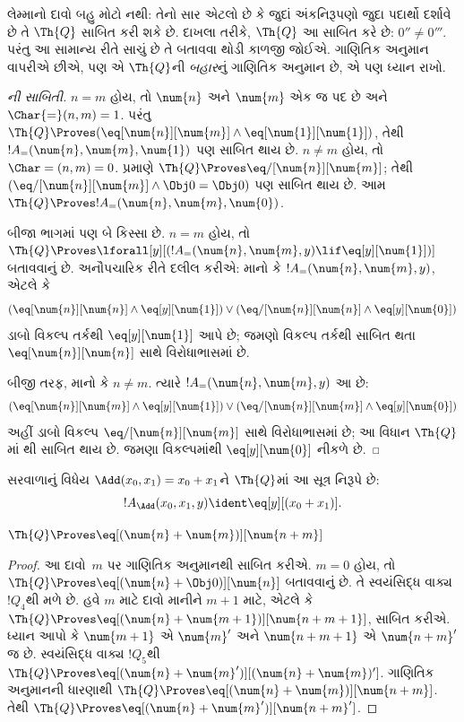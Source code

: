 \begin{explain}
લેમ્માનો દાવો બહુ મોટો નથી:
તેનો સાર એટલો છે કે જુદાં
અંકનિરૂપણો જુદા પદાર્થો દર્શાવે
છે તે $\Th{Q}$ સાબિત કરી શકે છે.
દાખલા તરીકે, $\Th{Q}$ આ સાબિત
કરે છે: $0'' \neq 0'''$.
પરંતુ આ સામાન્ય રીતે સાચું છે
તે બતાવવા થોડી કાળજી જોઈએ.
ગાણિતિક અનુમાન વાપરીએ છીએ, પણ એ
$\Th{Q}$ની \emph{બહાર}નું
ગાણિતિક અનુમાન છે, એ પણ ધ્યાન રાખો.
\end{explain}

\begin{proof}[ની સાબિતી]
$n = m$ હોય, તો $\num{n}$ અને
$\num{m}$ એક જ પદ છે અને
$\Char{=}(n, m) = 1$.
પરંતુ $\Th{Q} \Proves
(\eq[\num{n}][\num{m}] \land
\eq[\num{1}][\num{1}])$,
તેથી $!A_=(\num{n}, \num{m},
\num{1})$ પણ સાબિત થાય છે.
$n \neq m$ હોય, તો
$\Char=(n, m) = 0$.
 પ્રમાણે
$\Th{Q} \Proves \eq/[\num{n}][\num{m}]$;
તેથી
$(\eq/[\num{n}][\num{m}] \land \Obj 0 = \Obj 0)$
પણ સાબિત થાય છે. આમ
$\Th{Q} \Proves !A_=(\num{n},
\num{m}, \num{0})$.

બીજા ભાગમાં પણ બે કિસ્સા છે.
$n = m$ હોય, તો
$\Th{Q} \Proves \lforall[y][(!A_=(\num{n}, \num{m}, y)
  \lif \eq[y][\num{1}])]$
બતાવવાનું છે. અનૌપચારિક રીતે
દલીલ કરીએ: માનો કે
$!A_=(\num{n}, \num{m}, y)$,
એટલે કે
\[
(\eq[\num{n}][\num{n}] \land \eq[y][\num{1}]) \lor
(\eq/[\num{n}][\num{n}] \land \eq[y][\num{0}])
\]
ડાબો વિકલ્પ તર્કથી
$\eq[y][\num{1}]$ આપે છે;
જમણો વિકલ્પ તર્કથી સાબિત થતા
$\eq[\num{n}][\num{n}]$ સાથે
વિરોધાભાસમાં છે.

બીજી તરફ, માનો કે $n \neq m$.
ત્યારે $!A_=(\num{n},
\num{m}, y)$ આ છે:
\[
(\eq[\num{n}][\num{m}] \land \eq[y][\num{1}]) \lor
(\eq/[\num{n}][\num{m}] \land \eq[y][\num{0}])
\]
અહીં ડાબો વિકલ્પ
$\eq/[\num{n}][\num{m}]$ સાથે
વિરોધાભાસમાં છે; આ વિધાન
$\Th{Q}$માં
થી
સાબિત થાય છે. જમણા
વિકલ્પમાંથી $\eq[y][\num{0}]$
નીકળે છે.
\end{proof}

\begin{prop}
સરવાળાનું વિધેય
$\Add(x_0, x_1) = x_0+x_1$ને
$\Th{Q}$માં આ સૂત્ર નિરૂપે છે:
\[
  !A_{\Add}(x_0, x_1, y) \ident \eq[y][(x_0 + x_1)].
\]
\end{prop}

\begin{lem}
$\Th{Q} \Proves \eq[(\num{n} + \num{m})][\num{n+m}]$
\end{lem}

\begin{proof}
આ દાવો~$m$ પર ગાણિતિક અનુમાનથી
સાબિત કરીએ. $m = 0$ હોય, તો
$\Th{Q} \Proves
\eq[(\num{n} + \Obj 0)][\num{n}]$
બતાવવાનું છે. તે સ્વયંસિદ્ધ
વાક્ય~$!Q_4$થી મળે છે.
હવે $m$ માટે દાવો માનીને
$m+1$ માટે, એટલે કે
$\Th{Q} \Proves \eq[(\num{n} +
  \num{m+1})][\num{n+m+1}]$,
સાબિત કરીએ. ધ્યાન આપો કે
$\num{m+1}$ એ $\num{m}'$
અને $\num{n+m+1}$ એ
$\num{n+m}'$ જ છે.
સ્વયંસિદ્ધ વાક્ય $!Q_5$થી
$\Th{Q} \Proves
\eq[(\num{n} + \num{m}')][(\num{n}+\num{m})']$.
ગાણિતિક અનુમાનની ધારણાથી
$\Th{Q} \Proves
\eq[(\num{n} + \num{m})][\num{n+m}]$.
તેથી $\Th{Q} \Proves
\eq[(\num{n} + \num{m}')][\num{n+m}']$.
\end{proof}

